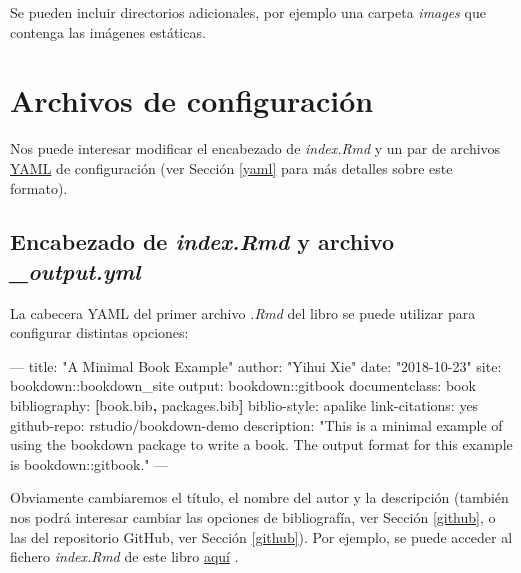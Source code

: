 \documentclass[]{book}
\newenvironment{Shaded}{\begin{snugshade}}{\end{snugshade}}
\newcommand{\KeywordTok}[1]{\textcolor[rgb]{0.13,0.29,0.53}{\textbf{#1}}}
\newcommand{\StringTok}[1]{\textcolor[rgb]{0.31,0.60,0.02}{#1}}
\newcommand{\OtherTok}[1]{\textcolor[rgb]{0.56,0.35,0.01}{#1}}
\newcommand{\FunctionTok}[1]{\textcolor[rgb]{0.00,0.00,0.00}{#1}}
\newcommand{\AttributeTok}[1]{\textcolor[rgb]{0.77,0.63,0.00}{#1}}
\newcommand{\NormalTok}[1]{#1}
\theoremstyle{definition}
\theoremstyle{definition}
\theoremstyle{definition}
\theoremstyle{remark}
\begin{document}
Se pueden incluir directorios adicionales, por ejemplo una carpeta
\emph{images} que contenga las imágenes estáticas.

\chapter{Archivos de configuración}\label{archivos-de-configuracion}

Nos puede interesar modificar el encabezado de \emph{index.Rmd} y un par
de archivos \href{https://en.wikipedia.org/wiki/YAML}{YAML} de
configuración (ver Sección \ref{yaml} para más detalles sobre este
formato).

\section{\texorpdfstring{Encabezado de \emph{index.Rmd} y archivo
\emph{\_output.yml}}{Encabezado de index.Rmd y archivo \_output.yml}}\label{encabezado-de-index.rmd-y-archivo-_output.yml}

La cabecera YAML del primer archivo \emph{.Rmd} del libro se puede
utilizar para configurar distintas opciones:

\begin{Shaded}
\begin{Highlighting}[]
\OtherTok{--- }
\FunctionTok{title:}\AttributeTok{ }\StringTok{"A Minimal Book Example"}
\FunctionTok{author:}\AttributeTok{ }\StringTok{"Yihui Xie"}
\FunctionTok{date:}\AttributeTok{ }\StringTok{"2018-10-23"}
\FunctionTok{site:}\AttributeTok{ bookdown::bookdown_site}
\FunctionTok{output:}\AttributeTok{ bookdown::gitbook}
\FunctionTok{documentclass:}\AttributeTok{ book}
\FunctionTok{bibliography:}\AttributeTok{ }\KeywordTok{[}\NormalTok{book.bib}\KeywordTok{,}\NormalTok{ packages.bib}\KeywordTok{]}
\FunctionTok{biblio-style:}\AttributeTok{ apalike}
\FunctionTok{link-citations:}\AttributeTok{ yes}
\FunctionTok{github-repo:}\AttributeTok{ rstudio/bookdown-demo}
\FunctionTok{description:}\AttributeTok{ }\StringTok{"This is a minimal example of using the bookdown package to write a book. The output format for this example is bookdown::gitbook."}
\OtherTok{---}
\end{Highlighting}
\end{Shaded}

Obviamente cambiaremos el título, el nombre del autor y la descripción
(también nos podrá interesar cambiar las opciones de bibliografía, ver
Sección \ref{github}, o las del repositorio GitHub, ver Sección
\ref{github}). Por ejemplo, se puede acceder al fichero \emph{index.Rmd}
de este libro
\href{https://github.com/rubenfcasal/bookdown_intro/raw/master/index.Rmd}{aquí}
.
\end{document}
